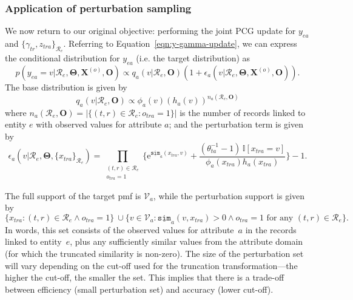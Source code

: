 \documentclass[12pt,letterpaper]{article}
\renewcommand\vec{\bm}
\newcommand{\simfn}{\mathtt{sim}} %
\newcommand{\truncsimfn}{\underline{\simfn}} %
\newcommand{\valset}{\mathcal{V}} %
\newcommand{\entset}{\mathcal{R}} %
\newcommand{\1}[1]{\mathbb{I}\!\left[#1\right]} %
\newcommand{\euler}{\mathrm{e}} %
\begin{document}
\subsubsection{Application of perturbation sampling}
We now return to our original objective: performing the joint PCG 
update for $y_{ea}$ and $\{\gamma_{tr}, z_{tra}\}_{\entset_{e}}$.
Referring to Equation~\ref{eqn:y-gamma-update}, we can express the 
conditional distribution for $y_{ea}$ (i.e. the target distribution) as
\begin{equation}
p(y_{ea} = v|\entset_{e}, \vec{\Theta}, \vec{X}^{(o)}, \vec{O}) \propto 
  q_{a}(v|\entset_{e}, \mathbf{O}) \left(1 + 
  \epsilon_{a}(v|\entset_{e}, \vec{\Theta}, \vec{X}^{(o)}, \vec{O}) \right).
\label{eqn:y-gamma-perturb}
\end{equation}
The base distribution is given by
\begin{equation}
q_{a}(v|\entset_{e}, \vec{O}) \propto 
\phi_{a}(v) \left( h_{a}(v) \right)^{n_a(\entset_{e}, \vec{O})}
\label{eqn:y-gamma-base}
\end{equation}
where $n_a(\entset_{e}, \vec{O}) = |\{(t,r) \in \entset_{e}: 
o_{tra}=1\}|$ is the number of records linked to entity $e$ with 
observed values for attribute $a$; and the perturbation term is 
given by
\begin{equation}
\epsilon_{a}(v|\entset_{e}, \vec{\Theta}, \{x_{tra}\}_{\entset_{e}}) = 
  \prod_{\substack{(t,r) \in \entset_{e}\\o_{tra}=1}} \Bigg\{ 
  \euler^{\truncsimfn_{a}(x_{tra}, v)} + 
  \frac{(\theta_{ta}^{-1} - 1) \, \1{x_{tra} = v}}{\phi_{a}(x_{tra}) h_{a}(x_{tra})} 
  \Bigg\} - 1.
\label{eqn:y-gamma-pert-term}
\end{equation}

The full support of the target pmf is $\valset_{a}$, 
while the perturbation support is given by
\begin{equation*}
\{x_{tra}: (t,r) \in \entset_{e} \wedge o_{tra} = 1\} \ \cup 
  \{v \in \valset_{a}: \truncsimfn_{a}(v, x_{tra}) > 0 \wedge 
  o_{tra} = 1 \text{ for any } (t,r) \in \entset_{e}\}.
\end{equation*}
In words, this set consists of the observed values for attribute~$a$ 
in the records linked to entity~$e$, plus any sufficiently similar 
values from the attribute domain (for which the truncated similarity 
is non-zero).
The size of the perturbation set will vary depending on the cut-off 
used for the truncation transformation---the higher the cut-off, 
the smaller the set.
This implies that there is a trade-off between efficiency (small 
perturbation set) and accuracy (lower cut-off).
\end{document}
